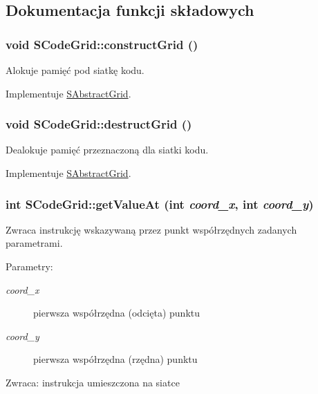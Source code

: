 \subsection{Dokumentacja funkcji składowych}
\hypertarget{classSCodeGrid_f15ba156433f88a40887e5ba72d9201a}{
\subsubsection[{constructGrid}]{\setlength{\rightskip}{0pt plus 5cm}void SCodeGrid::constructGrid ()}}
\label{classSCodeGrid_f15ba156433f88a40887e5ba72d9201a}


Alokuje pamięć pod siatkę kodu. 

Implementuje \hyperlink{classSAbstractGrid_919248aad138ffb1c969e73c3e637dcd}{SAbstractGrid}.\hypertarget{classSCodeGrid_6bd4c1bf841bd09c2ffb2e019c08b4ed}{
\subsubsection[{destructGrid}]{\setlength{\rightskip}{0pt plus 5cm}void SCodeGrid::destructGrid ()}}
\label{classSCodeGrid_6bd4c1bf841bd09c2ffb2e019c08b4ed}


Dealokuje pamięć przeznaczoną dla siatki kodu. 

Implementuje \hyperlink{classSAbstractGrid_fb63d8cf5210c3606a3b7add19f06833}{SAbstractGrid}.\hypertarget{classSCodeGrid_c57d52a49a55c91068fe0eb541e721f8}{
\subsubsection[{getValueAt}]{\setlength{\rightskip}{0pt plus 5cm}int SCodeGrid::getValueAt (int {\em coord\_\-x}, \/  int {\em coord\_\-y})}}
\label{classSCodeGrid_c57d52a49a55c91068fe0eb541e721f8}


Zwraca instrukcję wskazywaną przez punkt współrzędnych zadanych parametrami. \begin{Desc}
\item[Parametry:]
\begin{description}
\item[{\em coord\_\-x}]pierwsza współrzędna (odcięta) punktu \item[{\em coord\_\-y}]pierwsza współrzędna (rzędna) punktu \end{description}
\end{Desc}
\begin{Desc}
\item[Zwraca:]instrukcja umieszczona na siatce \end{Desc}


